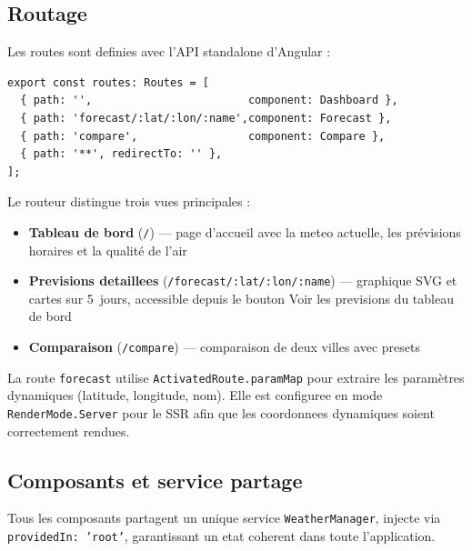 \documentclass[12pt,a4paper]{article}
\begin{document}
\subsection{Routage}

Les routes sont definies avec l'API standalone d'Angular :

\begin{lstlisting}[style=angular, caption={Definition des routes}]
export const routes: Routes = [
  { path: '',                        component: Dashboard },
  { path: 'forecast/:lat/:lon/:name',component: Forecast },
  { path: 'compare',                 component: Compare },
  { path: '**', redirectTo: '' },
];
\end{lstlisting}

Le routeur distingue trois vues principales :
\begin{itemize}[nosep]
    \item \textbf{Tableau de bord} (\texttt{/}) — page d'accueil avec la meteo actuelle, les prévisions horaires et la qualité de l'air
    \item \textbf{Previsions detaillees} (\texttt{/forecast/:lat/:lon/:name}) — graphique SVG et cartes sur 5~jours, accessible depuis le bouton \og{}Voir les previsions\fg{} du tableau de bord
    \item \textbf{Comparaison} (\texttt{/compare}) — comparaison de deux villes avec presets
\end{itemize}

La route \texttt{forecast} utilise \texttt{ActivatedRoute.paramMap} pour extraire les paramètres dynamiques (latitude, longitude, nom). Elle est configuree en mode \texttt{RenderMode.Server} pour le SSR afin que les coordonnees dynamiques soient correctement rendues.

\subsection{Composants et service partage}

Tous les composants partagent un unique service \texttt{WeatherManager}, injecte via \texttt{providedIn: 'root'}, garantissant un etat coherent dans toute l'application.

\begin{center}
\end{center}
\end{document}

